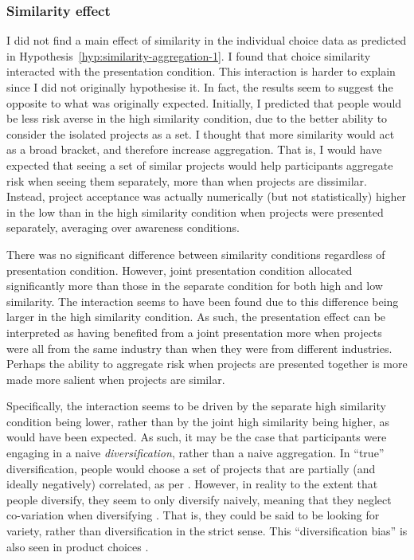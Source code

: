 \documentclass[a4paper, nobind, dvipsnames]{templates/ociamthesis}
\theoremstyle{definition}
\theoremstyle{definition}
\theoremstyle{definition}
\theoremstyle{definition}
\theoremstyle{remark}
\begin{document}
\hypertarget{similarity-discussion-aggregation-1}{%
\subsubsection{Similarity effect}\label{similarity-discussion-aggregation-1}}

I did not find a main effect of similarity in the individual choice data as
predicted in Hypothesis~\ref{hyp:similarity-aggregation-1}. I found that
choice similarity interacted with the presentation condition. This interaction
is harder to explain since I did not originally hypothesise it. In fact, the
results seem to suggest the opposite to what was originally expected. Initially,
I predicted that people would be less risk averse in the high similarity
condition, due to the better ability to consider the isolated projects as a set.
I thought that more similarity would act as a broad bracket, and therefore
increase aggregation. That is, I would have expected that seeing a set of
similar projects would help participants aggregate risk when seeing them
separately, more than when projects are dissimilar. Instead, project acceptance
was actually numerically (but not statistically) higher in the low than in the
high similarity condition when projects were presented separately, averaging
over awareness conditions.

There was no significant difference between similarity conditions regardless of
presentation condition. However, joint presentation condition allocated
significantly more than those in the separate condition for both high and low
similarity. The interaction seems to have been found due to this difference
being larger in the high similarity condition. As such, the presentation effect
can be interpreted as having benefited from a joint presentation more when
projects were all from the same industry than when they were from different
industries. Perhaps the ability to aggregate risk when projects are presented
together is more made more salient when projects are similar.

Specifically, the interaction seems to be driven by the separate high similarity
condition being lower, rather than by the joint high similarity being higher, as
would have been expected. As such, it may be the case that participants were
engaging in a naive \emph{diversification}, rather than a naive aggregation. In
``true'' diversification, people would choose a set of projects that are partially
(and ideally negatively) correlated, as per \textcite{markowitz1952}. However, in reality
to the extent that people diversify, they seem to only diversify naively,
meaning that they neglect co-variation when diversifying \autocite[e.g.,][]{hedesstrom2006}. That is, they could be said to be looking for variety, rather
than diversification in the strict sense. This ``diversification bias'' is also
seen in product choices \autocite{read1995}.
\end{document}
